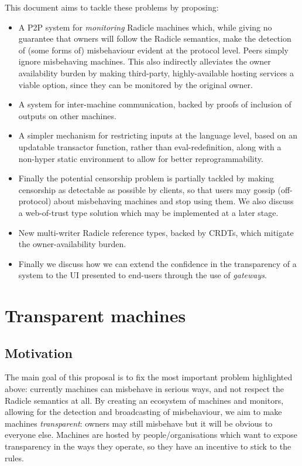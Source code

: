 \documentclass[a4paper, oneside, 10pt]{amsart}
\begin{document}
This document aims to tackle these problems by proposing:
\begin{itemize}
\item A P2P system for \emph{monitoring} Radicle machines which, while giving no
  guarantee that owners will follow the Radicle semantics, make the detection of
  (some forms of) misbehaviour evident at the protocol level. Peers simply
  ignore misbehaving machines. This also indirectly alleviates the owner
  availability burden by making third-party, highly-available hosting services a
  viable option, since they can be monitored by the original owner.
\item A system for inter-machine communication, backed by proofs of inclusion of
  outputs on other machines.
\item A simpler mechanism for restricting inputs at the language level, based on
  an updatable transactor function, rather than eval-redefinition, along with a
  non-hyper static environment to allow for better reprogrammability.
\item Finally the potential censorship problem is partially tackled by making
  censorship as detectable as possible by clients, so that users may gossip
  (off-protocol) about misbehaving machines and stop using them. We also discuss
  a web-of-trust type solution which may be implemented at a later stage.
\item
  New multi-writer Radicle reference types, backed by CRDTs, which mitigate the
  owner-availability burden.
\item
  Finally we discuss how we can extend the confidence in the transparency of a
  system to the UI presented to end-users through the use of \emph{gateways}.
\end{itemize}

\section{Transparent machines}\label{transparent-machines}

\subsection{Motivation}

The main goal of this proposal is to fix the most important problem highlighted
above: currently machines can misbehave in serious ways, and not respect the
Radicle semantics at all. By creating an ecosystem of machines and monitors,
allowing for the detection and broadcasting of misbehaviour, we aim to make
machines \emph{transparent}: owners may still misbehave but it will be obvious
to everyone else. Machines are hosted by people/organisations which want to
expose transparency in the ways they operate, so they have an incentive to stick
to the rules.
\end{document}
